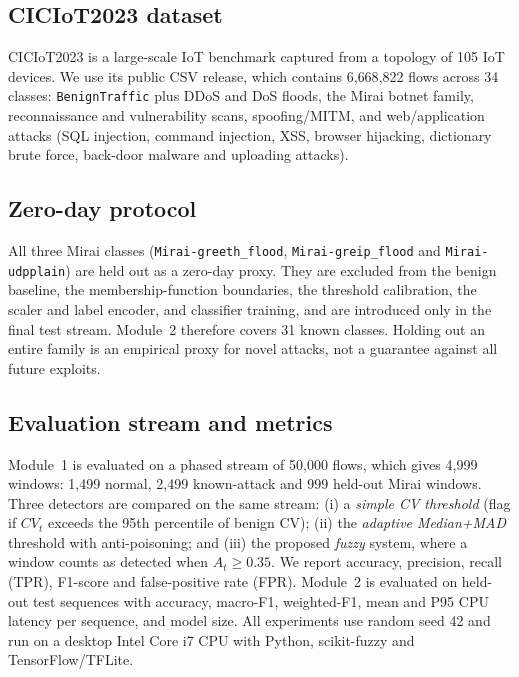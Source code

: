 \documentclass[]{interact}
\theoremstyle{plain}
\theoremstyle{definition}
\begin{document}
\subsection{CICIoT2023 dataset}
CICIoT2023 is a large-scale IoT benchmark captured from a topology of 105 IoT devices. We use its public CSV release, which contains 6{,}668{,}822 flows across 34 classes: \texttt{BenignTraffic} plus DDoS and DoS floods, the Mirai botnet family, reconnaissance and vulnerability scans, spoofing/MITM, and web/application attacks (SQL injection, command injection, XSS, browser hijacking, dictionary brute force, back-door malware and uploading attacks).

\subsection{Zero-day protocol}
All three Mirai classes (\texttt{Mirai-\allowbreak greeth\_\allowbreak flood}, \texttt{Mirai-\allowbreak greip\_\allowbreak flood} and \texttt{Mirai-\allowbreak udpplain}) are held out as a zero-day proxy. They are excluded from the benign baseline, the membership-function boundaries, the threshold calibration, the scaler and label encoder, and classifier training, and are introduced only in the final test stream. Module~2 therefore covers 31 known classes. Holding out an entire family is an empirical proxy for novel attacks, not a guarantee against all future exploits.

\subsection{Evaluation stream and metrics}
Module~1 is evaluated on a phased stream of 50{,}000 flows, which gives 4{,}999 windows: 1{,}499 normal, 2{,}499 known-attack and 999 held-out Mirai windows. Three detectors are compared on the same stream: (i) a \emph{simple CV threshold} (flag if $CV_t$ exceeds the 95th percentile of benign CV); (ii) the \emph{adaptive Median+MAD} threshold with anti-poisoning; and (iii) the proposed \emph{fuzzy} system, where a window counts as detected when $A_t \ge 0.35$. We report accuracy, precision, recall (TPR), F1-score and false-positive rate (FPR). Module~2 is evaluated on held-out test sequences with accuracy, macro-F1, weighted-F1, mean and P95 CPU latency per sequence, and model size. All experiments use random seed 42 and run on a desktop Intel Core i7 CPU with Python, scikit-fuzzy and TensorFlow/TFLite.

\end{document}
